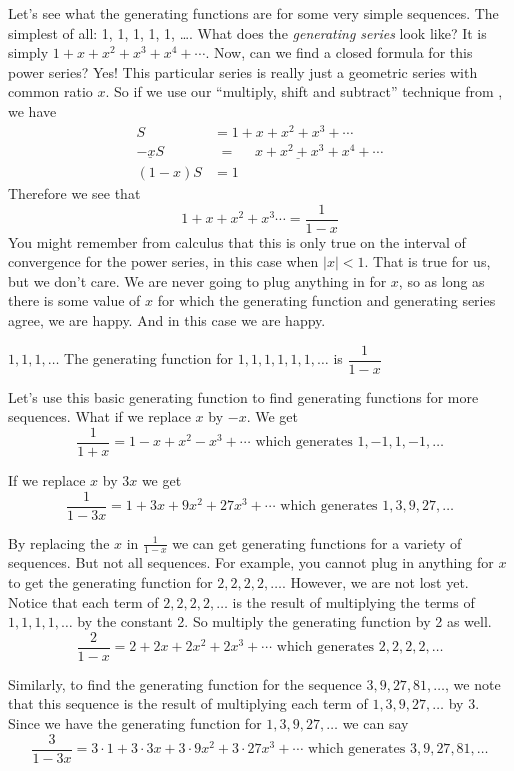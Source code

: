 \documentclass[12pt]{article}
\begin{document}
Let's see what the generating functions are for some very simple sequences.  The simplest of all: 1, 1, 1, 1, 1, \ldots.  What does the {\em generating series} look like?  It is simply $1 + x + x^2 + x^3 + x^4 + \cdots$.  Now, can we find a closed formula for this power series? Yes!  This particular series is really just a geometric series with common ratio $x$.  So if we use our ``multiply, shift and subtract'' technique from , we have
 \begin{align*}
  S & = 1 + x + x^2 + x^3 + \cdots \\
  \underline{- xS} & \underline{\,\, = ~~~~~~ x + x^2 + x^3 + x^4 + \cdots} \\
  (1-x)S & = 1
 \end{align*}
Therefore we see that 
 \[1 + x + x^2 + x^3 \cdots = \dfrac{1}{1-x}\]
You might remember from calculus that this is only true on the interval of convergence for the power series, in this case when $|x| < 1$.  That is true for us, but we don't care.  We are never going to plug anything in for $x$, so as long as there is some value of $x$ for which the generating function and generating series agree, we are happy. And in this case we are happy.

 \begin{defbox}{$1,1,1,\ldots$}
  The generating function for $1,1,1,1,1,1,\ldots$ is $\dfrac{1}{1-x}$
 \end{defbox}

  Let's use this basic generating function to find generating functions for more sequences.  What if we replace $x$ by $-x$.  We get 
 \[\frac{1}{1+x} = 1 - x + x^2 - x^3 + \cdots \mbox{ which generates } 1, -1, 1, -1, \ldots\]
 
 If we replace $x$ by $3x$ we get
 \[\frac{1}{1-3x} = 1 + 3x + 9x^2 + 27x^3 + \cdots \mbox{ which generates } 1, 3, 9, 27, \ldots\]
 
 By replacing the $x$ in $\frac{1}{1-x}$ we can get generating functions for a variety of sequences.  But not all sequences.  For example, you cannot plug in anything for $x$ to get the generating function for $2,2,2,2, \ldots$.  However, we are not lost yet.  Notice that each term of $2, 2, 2, 2, \ldots$ is the result of multiplying the terms of $1, 1, 1, 1, \ldots$ by the constant 2.  So multiply the generating function by 2 as well.
 \[\frac{2}{1-x} = 2 + 2x + 2x^2 + 2x^3 + \cdots \mbox{ which generates } 2, 2, 2, 2, \ldots\]
 
Similarly, to find the generating function for the sequence $3, 9, 27, 81, \ldots$, we note that this sequence is the result of multiplying each term of $1, 3, 9, 27, \ldots$ by 3.  Since we have the generating function for $1, 3, 9, 27, \ldots$ we can say
\[\frac{3}{1-3x} = 3\cdot 1 + 3\cdot 3x + 3\cdot 9x^2 + 3\cdot 27x^3 + \cdots \mbox{ which generates } 3, 9, 27, 81, \ldots\]
 
\end{document}
